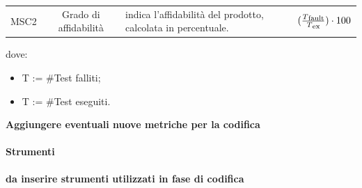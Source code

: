 \begin{itemize}
\begin{table}[H]
\begin{tabular}{ccp{7cm}c}
                  MSC2  &  Grado di affidabilità  &  indica l'affidabilità del prodotto, calcolata in percentuale.  & \Large$(\frac{T\mysubscript{fault}}{T\mysubscript{ex}})\cdot100$ \\    
                  \end{tabular}
            \end{table}
            dove:
            \begin{itemize}
                \item[] T := \#Test falliti;
                \item[] T := \#Test eseguiti.
            \end{itemize}

        \end{itemize}    
	
        \textbf{Aggiungere eventuali nuove metriche per la codifica}

        \paragraph{Strumenti}    \label{paragraph:Strumenti}
        \textbf{da inserire strumenti utilizzati in fase di codifica}
